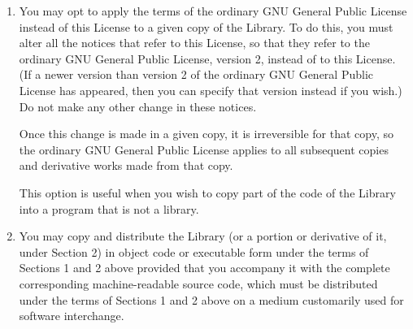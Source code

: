 {\begin{multicols}{2}
\begin{enumerate}
These requirements apply to the modified work as a whole. If identifiable 
sections of that work are not derived from the Library, and can be reasonably 
considered independent and separate works in themselves, then this License, and 
its terms, do not apply to those sections when you distribute them as separate 
works. But when you distribute the same sections as part of a whole which is a 
work based on the Library, the distribution of the whole must be on the terms of 
this License, whose permissions for other licensees extend to the entire whole, 
and thus to each and every part regardless of who wrote it.

Thus, it is not the intent of this section to claim rights or contest your 
rights to work written entirely by you; rather, the intent is to exercise the 
right to control the distribution of derivative or collective works based on the 
Library.

In addition, mere aggregation of another work not based on the Library with the 
Library (or with a work based on the Library) on a volume of a storage or 
distribution medium does not bring the other work under the scope of this 
License. 

\item
You may opt to apply the terms of the ordinary GNU General Public License 
instead of this License to a given copy of the Library. To do this, you must 
alter all the notices that refer to this License, so that they refer to the 
ordinary GNU General Public License, version 2, instead of to this License. (If 
a newer version than version 2 of the ordinary GNU General Public License has 
appeared, then you can specify that version instead if you wish.) Do not make 
any other change in these notices.

Once this change is made in a given copy, it is irreversible for that copy, so 
the ordinary GNU General Public License applies to all subsequent copies and 
derivative works made from that copy.

This option is useful when you wish to copy part of the code of the Library into 
a program that is not a library. 

\item
You may copy and distribute the Library (or a portion or derivative of it, under 
Section 2) in object code or executable form under the terms of Sections 1 and 2 
above provided that you accompany it with the complete corresponding 
machine-readable source code, which must be distributed under the terms of 
Sections 1 and 2 above on a medium customarily used for software interchange.


\end{enumerate}
\end{multicols}}
